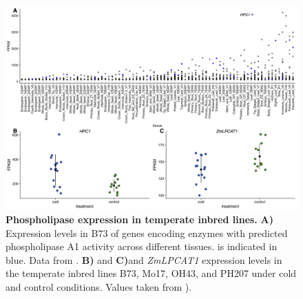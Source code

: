 \begin{subappendices}
\begin{figure}[t]
\begin{center}
\includegraphics[width=\linewidth]{Sup_Figures/Sup_Fig_4.png}
\caption[Phospholipase expression in temperate inbred lines.]{\textbf{Phospholipase expression in temperate inbred lines.} \textbf{A)} Expression levels in B73 of genes encoding enzymes with predicted phospholipase A1 activity across different tissues. \hpc is indicated in blue. 
Data from \cite{stelpflug2016-vr}.
\textbf{B)}  and \textbf{C)}\hpc and \textit{ZmLPCAT1} expression levels in the temperate inbred lines B73, Mo17, OH43, and PH207 under cold and control conditions. Values taken from \cite{waters2017-nat}).
}
\label{figure:Sup:B73_expression}
\end{center}
\end{figure} 
\clearpage


\end{subappendices}
